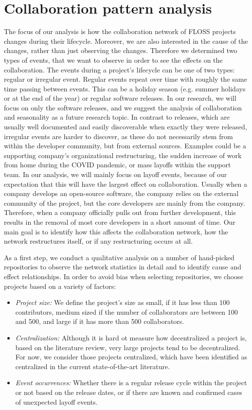 \section{Collaboration pattern analysis}
The focus of our analysis is how the collaboration network of FLOSS projects changes during their lifecycle. Moreover, we are also interested in the cause of the changes, rather than just observing the changes. Therefore we determined two types of events, that we want to observe in order to see the effects on the collaboration. The events during a project's lifecycle can be one of two types: regular or irregular event. Regular events repeat over time with roughly the same time passing between events. This can be a holiday season (e.g. summer holidays or at the end of the year) or regular software releases. In our research, we will focus on only the software releases, and we suggest the analysis of collaboration and seasonality as a future research topic. In contrast to releases, which are usually well documented and easily discoverable when exactly they were released, irregular events are harder to discover, as these do not necessarily stem from within the developer community, but from external sources. Examples could be a supporting company's organizational restructuring, the sudden increase of work from home during the COVID pandemic, or mass layoffs within the support team. In our analysis, we will mainly focus on layoff events, because of our expectation that this will have the largest effect on collaboration. Usually when a company develops an open-source software, the company relies on the external community of the project, but the core developers are mainly from the company. Therefore, when a company officially pulls out from further development, this results in the removal of most core developers in a short amount of time. Our main goal is to identify how this affects the collaboration network, how the network restructures itself, or if any restructuring occurs at all.

As a first step, we conduct a qualitative analysis on a number of hand-picked repositories to observe the network statistics in detail and to identify cause and effect relationships. In order to avoid bias when selecting repositories, we choose projects based on a variety of factors:

\begin{itemize}
    \item \textit{Project size:} We define the project's size as small, if it has less than 100 contributors, medium sized if the number of collaborators are between 100 and 500, and large if it has more than 500 collaborators.
    \item \textit{Centralization:} Although it is hard ot measure how decentralized a project is, based on the literature review, very large projects tend to be decentralized. For now, we consider those projects centralized, which have been identified as centralized in the current state-of-the-art literature. 
    \item \textit{Event occurrences:} Whether there is a regular release cycle within the project or not based on the release dates, or if there are known and confirmed cases of unexpected layoff events.
\end{itemize}

